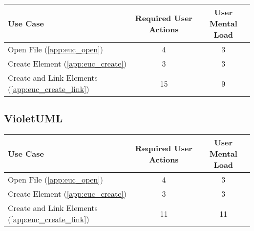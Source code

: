 \begin{tabularx}{\textwidth}{Xcc}
\textbf{Use Case} & \textbf{Required User Actions} & \textbf{User Mental Load}\\
\hline
Open File (\ref{app:euc_open})                       & 4  & 3 \\
Create Element (\ref{app:euc_create})                & 3  & 3 \\
Create and Link Elements (\ref{app:euc_create_link}) & 15 & 9
\end{tabularx}

\subsection*{VioletUML}




\begin{tabularx}{\textwidth}{Xcc}
\textbf{Use Case} & \textbf{Required User Actions} & \textbf{User Mental Load}\\
\hline
Open File (\ref{app:euc_open})                       & 4  & 3 \\
Create Element (\ref{app:euc_create})                & 3  & 3 \\
Create and Link Elements (\ref{app:euc_create_link}) & 11 & 11
\end{tabularx}

